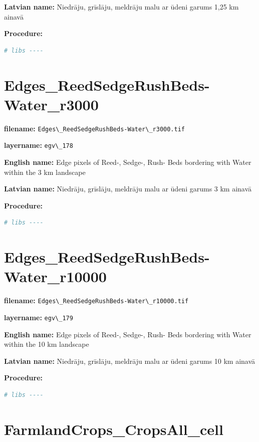 \documentclass[
]{book}
\newcommand{\passthrough}[1]{#1}
\begin{document}
\textbf{Latvian name:} Niedrāju, grīslāju, meldrāju malu ar ūdeni garums 1,25 km ainavā

\textbf{Procedure:}

\begin{lstlisting}[language=R]
# libs ----
\end{lstlisting}

\section{Edges\_ReedSedgeRushBeds-Water\_r3000}\label{ch06.178}

\textbf{filename:} \passthrough{\lstinline!Edges\_ReedSedgeRushBeds-Water\_r3000.tif!}

\textbf{layername:} \passthrough{\lstinline!egv\_178!}

\textbf{English name:} Edge pixels of Reed-, Sedge-, Rush- Beds bordering with Water within the 3 km landscape

\textbf{Latvian name:} Niedrāju, grīslāju, meldrāju malu ar ūdeni garums 3 km ainavā

\textbf{Procedure:}

\begin{lstlisting}[language=R]
# libs ----
\end{lstlisting}

\section{Edges\_ReedSedgeRushBeds-Water\_r10000}\label{ch06.179}

\textbf{filename:} \passthrough{\lstinline!Edges\_ReedSedgeRushBeds-Water\_r10000.tif!}

\textbf{layername:} \passthrough{\lstinline!egv\_179!}

\textbf{English name:} Edge pixels of Reed-, Sedge-, Rush- Beds bordering with Water within the 10 km landscape

\textbf{Latvian name:} Niedrāju, grīslāju, meldrāju malu ar ūdeni garums 10 km ainavā

\textbf{Procedure:}

\begin{lstlisting}[language=R]
# libs ----
\end{lstlisting}

\section{FarmlandCrops\_CropsAll\_cell}\label{ch06.180}
\end{document}
